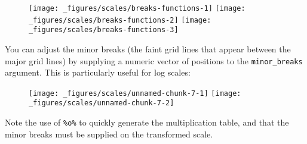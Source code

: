\begin{figure}[H]
  \texttt{[image: \_figures/scales/breaks-functions-1]}%
  \texttt{[image: \_figures/scales/breaks-functions-2]}%
  \texttt{[image: \_figures/scales/breaks-functions-3]}
\end{figure}

You can adjust the minor breaks (the faint grid lines that appear
between the major grid lines) by supplying a numeric vector of positions
to the \texttt{minor\_breaks} argument. This is particularly useful for
log scales: 

\begin{Shaded}
\end{Shaded}

\begin{figure}[H]
  \texttt{[image: \_figures/scales/unnamed-chunk-7-1]}%
  \texttt{[image: \_figures/scales/unnamed-chunk-7-2]}
\end{figure}

Note the use of \texttt{\%o\%} to quickly generate the multiplication
table, and that the minor breaks must be supplied on the transformed
scale. 

